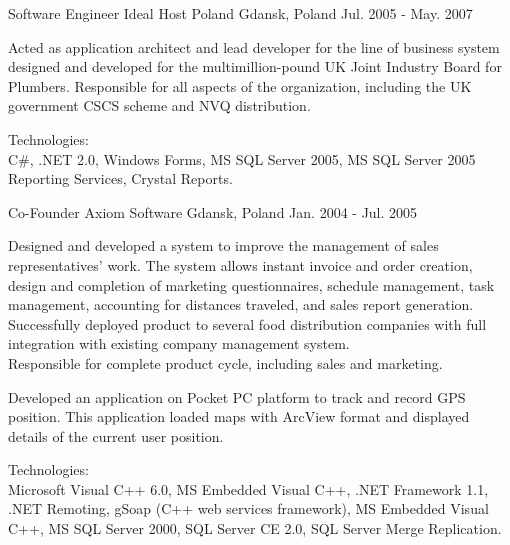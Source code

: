 \begin{cventries}
\cventry
{Software Engineer} %
{Ideal Host Poland} %
{Gdansk, Poland} %
{Jul. 2005 - May. 2007} %
{
  \begin{cvitems} %
    \item
    {
      Acted as application architect and lead developer for the line of business system
      designed and developed for the multimillion-pound UK Joint Industry Board for Plumbers.
      Responsible for all aspects of the organization, including the UK government CSCS scheme and NVQ distribution.
    }
    \item
    {
      Technologies:\\
      {C\#}, .NET 2.0, Windows Forms, MS SQL Server 2005, MS SQL Server 2005 Reporting Services, Crystal Reports.
    }
  \end{cvitems}
}

\cventry
{Co-Founder} %
{Axiom Software} %
{Gdansk, Poland} %
{Jan. 2004 - Jul. 2005} %
{
  \begin{cvitems} %
    \item
    {
      Designed and developed a system to improve the management of sales representatives' work. The system allows instant invoice and order creation, design and completion of marketing questionnaires, schedule management, task management, accounting for distances traveled, and sales report generation.
      Successfully deployed product to several food distribution companies with full integration with existing company management system. \\
      Responsible for complete product cycle, including sales and marketing.
    }
    \item
    {
      Developed an application on Pocket PC platform to track and record GPS position. This application loaded maps with ArcView format and displayed details of the current user position.
    }
    \item
    {
      Technologies:\\
      Microsoft Visual C++ 6.0, MS Embedded Visual C++, .NET Framework 1.1,
      .NET Remoting, gSoap (C++ web services framework), MS Embedded Visual C++,
      MS SQL Server 2000, SQL Server CE 2.0, SQL Server Merge Replication.
    }
  \end{cvitems}
}


\end{cventries}
